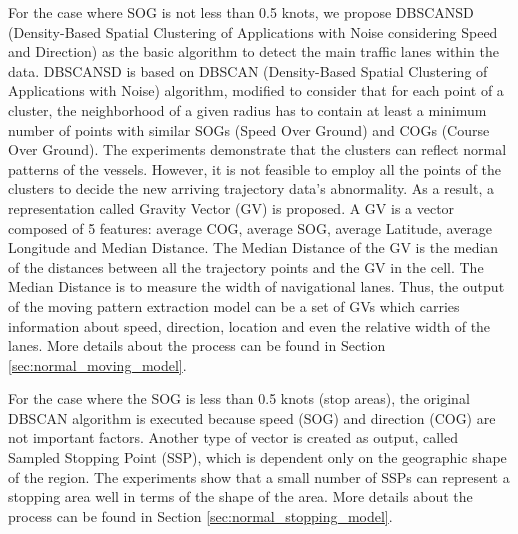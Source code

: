 \documentclass[12pt,glossary]{dalcsthesis}
\begin{document}
For the case where SOG is not less than 0.5 knots, we propose DBSCANSD (Density-Based Spatial Clustering of Applications with Noise considering Speed and Direction) as the basic algorithm to detect the main traffic lanes within the data. DBSCANSD is based on DBSCAN (Density-Based Spatial Clustering of Applications with Noise) \cite{DBScan96} algorithm, modified to consider that for each point of a cluster, the neighborhood of a given radius has to contain at least a minimum number of points with similar SOGs (Speed Over Ground) and COGs (Course Over Ground). The experiments demonstrate that the clusters can reflect normal patterns of the vessels. However, it is not feasible to employ all the points of the clusters to decide the new arriving trajectory data's abnormality. As a result, a representation called Gravity Vector (GV) is proposed. A GV is a vector composed of 5 features: average COG, average SOG, average Latitude, average Longitude and Median Distance. The Median Distance of the GV is the median of the distances between all the trajectory points and the GV in the cell. The Median Distance is to measure the width of navigational lanes. Thus, the output of the moving pattern extraction model can be a set of GVs which carries information about speed, direction, location and even the relative width of the lanes.
More details about the process can be found in Section \ref{sec:normal_moving_model}.

For the case where the SOG is less than 0.5 knots (stop areas), the original DBSCAN algorithm \cite{DBScan96} is executed because speed (SOG) and direction (COG) are not important factors. Another type of vector is created as output, called Sampled Stopping Point (SSP), which is dependent only on the geographic shape of the region. The experiments show that a small number of SSPs can represent a stopping area well in terms of the shape of the area. More details about the process can be found in Section \ref{sec:normal_stopping_model}.
\end{document}
